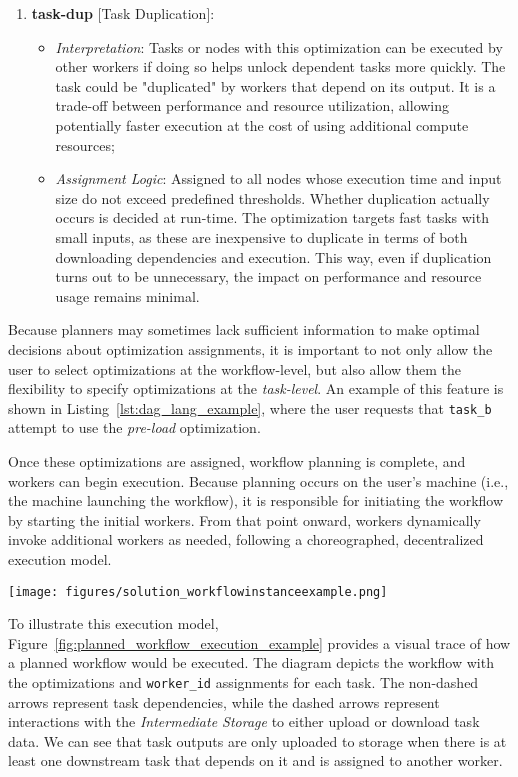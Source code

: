 \documentclass[conference]{IEEEtran}
\begin{document}
\begin{enumerate}
\item\textbf{task-dup} [Task Duplication]:
\begin{itemize}
  \item \textit{Interpretation}: Tasks or nodes with this optimization can be executed by other workers if doing so helps unlock dependent tasks more quickly. The task could be "duplicated" by workers that depend on its output. It is a trade-off between performance and resource utilization, allowing potentially faster execution at the cost of using additional compute resources;
  \item \textit{Assignment Logic}: Assigned to all nodes whose execution time and input size do not exceed predefined thresholds. Whether duplication actually occurs is decided at run-time. The optimization targets fast tasks with small inputs, as these are inexpensive to duplicate in terms of both downloading dependencies and execution. This way, even if duplication turns out to be unnecessary, the impact on performance and resource usage remains minimal.
\end{itemize}
\end{enumerate}
Because planners may sometimes lack sufficient information to make optimal decisions about optimization assignments, it is important to not only allow the user to select optimizations at the workflow-level, but also allow them the flexibility to specify optimizations at the \textit{task-level}. An example of this feature is shown in Listing~\ref{lst:dag_lang_example}, where the user requests that \texttt{task\_b} attempt to use the \textit{pre-load} optimization.

Once these optimizations are assigned, workflow planning is complete, and workers can begin execution. Because planning occurs on the user's machine (i.e., the machine launching the workflow), it is responsible for initiating the workflow by starting the initial workers. From that point onward, workers dynamically invoke additional workers as needed, following a choreographed, decentralized execution model.

\begin{figure*}[h]
    \centering
    \texttt{[image: figures/solution\_workflowinstanceexample.png]}
    \caption{Planned Workflow Execution Example}
    \label{fig:planned_workflow_execution_example}
\end{figure*}

To illustrate this execution model, Figure~\ref{fig:planned_workflow_execution_example} provides a visual trace of how a planned workflow would be executed. The diagram depicts the workflow with the optimizations and \texttt{worker\_id} assignments for each task. The non-dashed arrows represent task dependencies, while the dashed arrows represent interactions with the \textit{Intermediate Storage} to either upload or download task data. We can see that task outputs are only uploaded to storage when there is at least one downstream task that depends on it and is assigned to another worker. 
\end{document}
